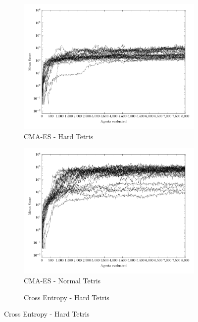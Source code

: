\begin{figure}
	\centering
	\captionsetup[subfigure]{justification=centering}
    \begin{subfigure}[b]{0.49\textwidth}
    	\caption{CMA-ES - Hard Tetris}
        \includegraphics[width=\textwidth]{data/complexity/cma_hard/PlotFile.pdf}
    \end{subfigure} 
    \begin{subfigure}[b]{0.49\textwidth}
    	\caption{CMA-ES - Normal Tetris}
        \includegraphics[width=\textwidth]{data/complexity/cma_normal/PlotFile.pdf}
    \end{subfigure}
    \begin{subfigure}[b]{0.49\textwidth}
    	\caption{Cross Entropy - Hard Tetris}

\end{subfigure}
\end{figure}
